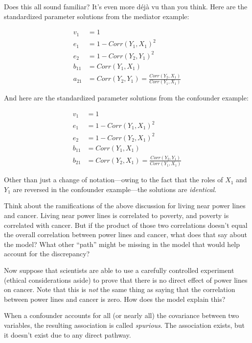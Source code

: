 \documentclass[
]{book}
\begin{document}
Does this all sound familiar? It's even more déjà vu than you think. Here are the standardized parameter solutions from the mediator example:

\begin{align}
v_{1}   &= 1                            \\
e_{1}   &= 1 - Corr(Y_{1}, X_{1})^{2}   \\
e_{2}   &= 1 - Corr(Y_{2}, Y_{1})^{2}      \\
b_{11}  &= Corr(Y_{1}, X_{1})           \\
a_{21}  &= Corr(Y_{2}, Y_{1}) = \frac{Corr(Y_{2}, X_{1})}{Corr(Y_{1}, X_{1})}
\end{align}

And here are the standardized parameter solutions from the confounder example:

\begin{align}
v_{1}   &= 1                            \\
e_{1}   &= 1 - Corr(Y_{1}, X_{1})^{2}   \\
e_{2}   &= 1 - Corr(Y_{2}, X_{1})^{2}   \\
b_{11}  &= Corr(Y_{1}, X_{1})           \\
b_{21}  &= Corr(Y_{2}, X_{1}) = \frac{Corr(Y_{2}, Y_{1})}{Corr(Y_{1}, X_{1})}
\end{align}

Other than just a change of notation---owing to the fact that the roles of \(X_{1}\) and \(Y_{1}\) are reversed in the confounder example---the solutions are \emph{identical}.

Think about the ramifications of the above discussion for living near power lines and cancer. Living near power lines is correlated to poverty, and poverty is correlated with cancer. But if the product of those two correlations doesn't equal the overall correlation between power lines and cancer, what does that say about the model? What other ``path'' might be missing in the model that would help account for the discrepancy?

Now suppose that scientists are able to use a carefully controlled experiment (ethical considerations aside) to prove that there is no direct effect of power lines on cancer. Note that this is \emph{not} the same thing as saying that the correlation between power lines and cancer is zero. How does the model explain this?

When a confounder accounts for all (or nearly all) the covariance between two variables, the resulting association is called \emph{spurious}. The association exists, but it doesn't exist due to any direct pathway.
\end{document}
